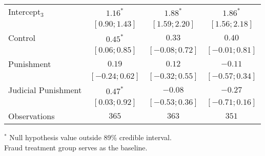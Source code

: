 \begin{table}[h]
\begin{center}
\begin{threeparttable}
\begin{tabular}{l c c c}
Intercept$_3$       & $1.16^{*}$        & $1.88^{*}$        & $1.86^{*}$        \\
                    & $ [ 0.90;  1.43]$ & $ [ 1.59;  2.20]$ & $ [ 1.56;  2.18]$ \\
Control             & $0.45^{*}$        & $0.33$            & $0.40$            \\
                    & $ [ 0.06;  0.85]$ & $ [-0.08;  0.72]$ & $ [-0.01;  0.81]$ \\
Punishment          & $0.19$            & $0.12$            & $-0.11$           \\
                    & $ [-0.24;  0.62]$ & $ [-0.32;  0.55]$ & $ [-0.57;  0.34]$ \\
Judicial Punishment & $0.47^{*}$        & $-0.08$           & $-0.27$           \\
                    & $ [ 0.03;  0.92]$ & $ [-0.53;  0.36]$ & $ [-0.71;  0.16]$ \\
\hline
Observations        & $365$             & $363$             & $351$             \\
\hline
\end{tabular}
\begin{tablenotes}[flushleft]
\scriptsize{$^*$ Null hypothesis value outside 89\% credible interval.  \\
Fraud treatment group serves as the baseline.}
\end{tablenotes}
\end{threeparttable}
\label{table:coefficients}
\end{center}
\end{table}
